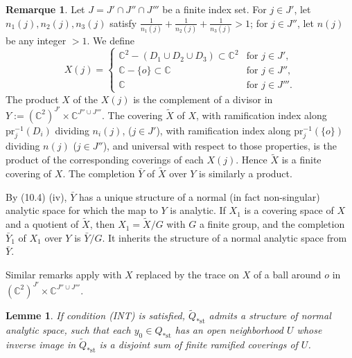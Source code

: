 \documentclass[12pt,a4paper]{article}
\theoremstyle{plain}
\newtheorem{lemma}[theorem]{Lemme}
\theoremstyle{definition}
\newtheorem{remark}[theorem]{Remarque}
\theoremstyle{remark}
\begin{document}
\begin{remark}
\label{10.5}
Let $J = J' \cap J'' \cap J'''$ be a finite index set. For $j \in J'$, let $n_1(j), n_2(j), n_3(j)$ satisfy $\frac{1}{n_1(j)} + \frac{1}{n_2(j)} + \frac{1}{n_3(j)} > 1$; for $j \in J''$, let $n(j)$ be any integer $> 1$. We define
\[
X(j) = \begin{cases}
\mathbb{C}^2 - (D_1 \cup D_2 \cup D_3) \subset \mathbb{C}^2 & \text{for } j \in J', \\
\mathbb{C} - \{o\} \subset \mathbb{C} & \text{for } j \in J'', \\
\mathbb{C} & \text{for } j \in J'''.\end{cases}
\]
The product $X$ of the $X(j)$ is the complement of a divisor in $Y := (\mathbb{C}^2)^{J'} \times \mathbb{C}^{J'' \cup J'''}$. The covering $\widetilde{X}$ of $X$, with ramification index along $\text{pr}_j^{-1}(D_i)$ dividing $n_i(j)$, ($j \in J'$), with ramification index along $\text{pr}_j^{-1}(\{o\})$ dividing $n(j)$ ($j \in J''$), and universal with respect to those properties, is the product of the corresponding coverings of each $X(j)$. Hence $\widetilde{X}$ is a finite covering of $X$. The completion $\bar{Y}$ of $\widetilde{X}$ over $Y$ is similarly a product.

By (10.4) (iv), $\bar{Y}$ has a unique structure of a normal (in fact non-singular) analytic space for which the map to $Y$ is analytic. If $X_1$ is a covering space of $X$ and a quotient of $\widetilde{X}$, then $X_1 = \widetilde{X}/G$ with $G$ a finite group, and the completion $\bar{Y}_1$ of $X_1$ over $Y$ is $\bar{Y}/G$. It inherits the structure of a normal analytic space from $\bar{Y}$.

Similar remarks apply with $X$ replaced by the trace on $X$ of a ball around $o$ in $(\mathbb{C}^2)^{J'} \times \mathbb{C}^{J'' \cup J'''}$.
\end{remark}

\begin{lemma}
\label{10.6}
If condition (INT) is satisfied, $\widetilde{Q}_{*\text{st}}$ admits a structure of normal analytic space, such that each $y_0 \in Q_{*\text{st}}$ has an open neighborhood $U$ whose inverse image in $\widetilde{Q}_{*\text{st}}$ is a disjoint sum of finite ramified coverings of $U$.
\end{lemma}
\end{document}
